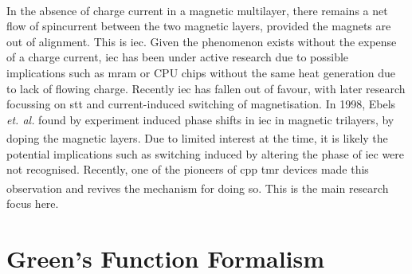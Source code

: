 \documentclass[a4paper, 12pt]{article}
\newcommand{\site}[1]{\textsuperscript{\textcolor{blue}{\cite{#1}}}}
\begin{document}
	\\\par In the absence of charge current in a magnetic multilayer, there remains a net flow of spincurrent between the two magnetic layers, provided the magnets are out of alignment. This is \gls{iec}. Given the phenomenon exists without the expense of a charge current, \gls{iec} has been under active research due to possible implications such as \gls{mram} or CPU chips without the same heat generation due to lack of flowing charge. Recently \gls{iec} has fallen out of favour, with later research focussing on \gls{stt} and current-induced switching of magnetisation. In 1998, Ebels \textit{et. al.} found by experiment induced phase shifts in \gls{iec} in magnetic trilayers, by doping the magnetic layers\site{ebels}. Due to limited interest at the time, it is likely the potential implications such as switching induced by altering the phase of \gls{iec} were not recognised. Recently, one of the pioneers of \gls{cpp} \gls{tmr} devices made this observation and revives the mechanism for doing so\textsuperscript{\textcolor{blue}{\cite{AUphase}}}. This is the main research focus here.
	\section{Green's Function Formalism}
\end{document}

